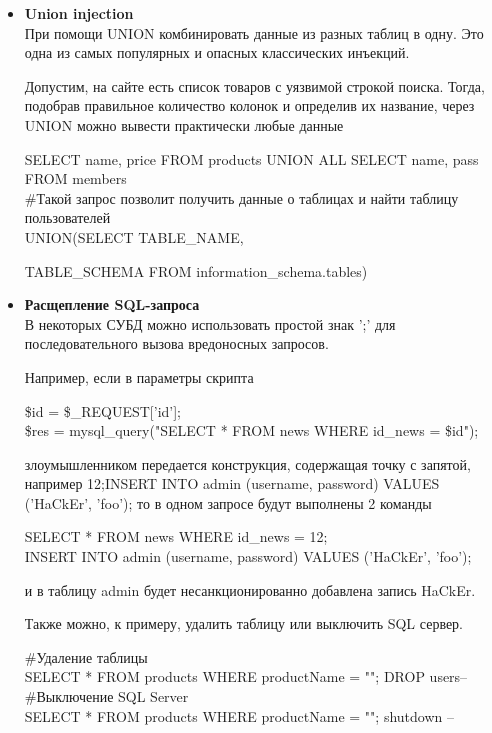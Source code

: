 \begin{itemize}
    \item \textbf{Union injection}\\
    При помощи UNION комбинировать данные из разных таблиц в одну. Это одна из самых популярных и опасных классических инъекций.

    Допустим, на сайте есть список товаров с уязвимой строкой поиска. Тогда, подобрав правильное количество колонок и определив их название, через UNION можно вывести практически любые данные
    \begin{grayquote}
        SELECT name, price FROM products UNION ALL SELECT name, pass FROM members\\
        \#Такой запрос позволит получить данные о таблицах и найти таблицу пользователей\\
        UNION(SELECT TABLE\_NAME,

        TABLE\_SCHEMA FROM information\_schema.tables)
    \end{grayquote}

    \item \textbf{Расщепление SQL-запроса}\\
    В некоторых СУБД можно использовать простой знак ';' для последовательного вызова вредоносных запросов.
    
    Например, если в параметры скрипта
    \begin{grayquote}
    	\$id = \$\_REQUEST['id'];\\
    	\$res = mysql\_query("SELECT * FROM news WHERE id\_news = \$id");  
    \end{grayquote}
    злоумышленником передается конструкция, содержащая точку с запятой, например 12;INSERT INTO admin (username, password) VALUES ('HaCkEr', 'foo'); то в одном запросе будут выполнены 2 команды    	
    \begin{grayquote}
		SELECT * FROM news WHERE id\_news = 12;\\
   	 	INSERT INTO admin (username, password) VALUES ('HaCkEr', 'foo');
    \end{grayquote}
    и в таблицу admin будет несанкционированно добавлена запись HaCkEr.
    
    Также можно, к примеру, удалить таблицу или выключить SQL сервер.
    
    \begin{grayquote}
        \#Удаление таблицы\\
        SELECT * FROM products WHERE productName = ""; DROP users--\\
        \#Выключение SQL Server\\
        SELECT * FROM products WHERE productName = ""; shutdown –
    \end{grayquote}



\end{itemize}
